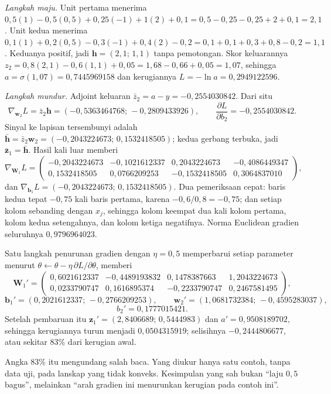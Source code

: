 \emph{Langkah maju.} Unit pertama menerima
$0{,}5(1)-0{,}5(0{,}5)+0{,}25(-1)+1(2)+0{,}1=0{,}5-0{,}25-0{,}25+2+0{,}1=2{,}1$.
Unit kedua menerima
$0{,}1(1)+0{,}2(0{,}5)-0{,}3(-1)+0{,}4(2)-0{,}2=0{,}1+0{,}1+0{,}3+0{,}8-0{,}2=1{,}1$.
Keduanya positif, jadi $\mathbf{h}=(2{,}1;\,1{,}1)$ tanpa pemotongan. Skor keluarannya
$z_{2}=0{,}8(2{,}1)-0{,}6(1{,}1)+0{,}05=1{,}68-0{,}66+0{,}05=1{,}07$, sehingga
$a=\sigma(1{,}07)=0{,}7445969158$ dan kerugiannya $L=-\ln a=0{,}2949122596$.

\emph{Langkah mundur.} Adjoint keluaran $\bar{z}_{2}=a-y=-0{,}2554030842$. Dari situ
\[
  \nabla_{\mathbf{w}_{2}}L=\bar{z}_{2}\mathbf{h}
  =(-0{,}5363464768;\,-0{,}2809433926),\qquad
  \frac{\partial L}{\partial b_{2}}=-0{,}2554030842 .
\]
Sinyal ke lapisan tersembunyi adalah
$\bar{\mathbf{h}}=\bar{z}_{2}\mathbf{w}_{2}=(-0{,}2043224673;\,0{,}1532418505)$; kedua
gerbang terbuka, jadi $\bar{\mathbf{z}}_{1}=\bar{\mathbf{h}}$. Hasil kali luar memberi
\[
  \nabla_{\mathbf{W}_{1}}L=
  \begin{pmatrix}
  -0{,}2043224673&-0{,}1021612337&0{,}2043224673&-0{,}4086449347\\
  0{,}1532418505&0{,}0766209253&-0{,}1532418505&0{,}3064837010
  \end{pmatrix},
\]
dan $\nabla_{\mathbf{b}_{1}}L=(-0{,}2043224673;\,0{,}1532418505)$. Dua pemeriksaan cepat: baris kedua tepat $-0{,}75$ kali baris pertama, karena $-0{,}6/0{,}8=-0{,}75$; dan setiap kolom sebanding dengan $x_{j}$, sehingga kolom keempat dua kali kolom pertama, kolom kedua setengahnya, dan kolom ketiga negatifnya. Norma Euclidean gradien seluruhnya
$0{,}9796964023$.

Satu langkah penurunan gradien dengan $\eta=0{,}5$ memperbarui setiap parameter menurut
$\theta\leftarrow\theta-\eta\,\partial L/\partial\theta$, memberi
\[
  \mathbf{W}_{1}'=\begin{pmatrix}
  0{,}6021612337&-0{,}4489193832&0{,}1478387663&1{,}2043224673\\
  0{,}0233790747&0{,}1616895374&-0{,}2233790747&0{,}2467581495
  \end{pmatrix},
\]
\[
  \mathbf{b}_{1}'=(0{,}2021612337;\,-0{,}2766209253),\qquad
  \mathbf{w}_{2}'=(1{,}0681732384;\,-0{,}4595283037),
\]
\[
  b_{2}'=0{,}1777015421 .
\]
Setelah pembaruan itu $\mathbf{z}_{1}'=(2{,}8406689;\,0{,}5444983)$ dan
$a'=0{,}9508189702$, sehingga kerugiannya turun menjadi $0{,}0504315919$; selisihnya
$-0{,}2444806677$, atau sekitar $83\%$ dari kerugian awal.

Angka $83\%$ itu mengundang salah baca. Yang diukur hanya satu contoh, tanpa data uji, pada lanskap yang tidak konveks. Kesimpulan yang sah bukan ``laju $0{,}5$ bagus'', melainkan ``arah gradien ini menurunkan kerugian pada contoh ini''.

